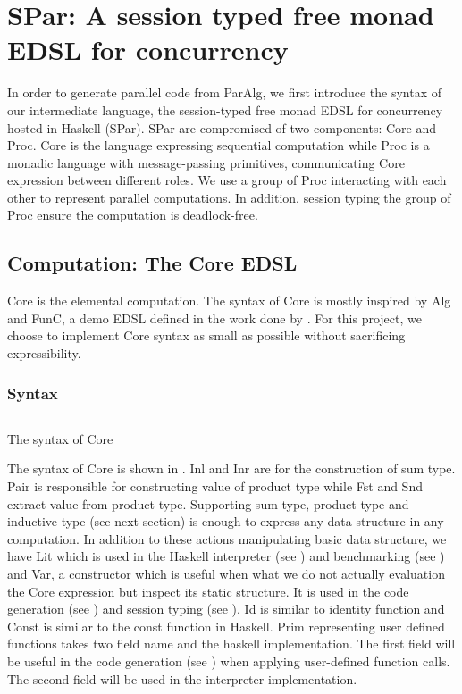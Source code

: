 \chapter{SPar: A session typed free monad EDSL for concurrency} \label{chap:spar}
In order to generate parallel code from ParAlg, we first introduce the syntax of our intermediate language, the session-typed free monad EDSL for concurrency hosted in Haskell (SPar). SPar are compromised of two components: Core and Proc. Core is the language expressing sequential computation while Proc is a monadic language with message-passing primitives, communicating Core expression between different roles. We use a group of Proc interacting with each other to represent parallel computations. In addition, session typing the group of Proc ensure the computation is deadlock-free. 
\section{Computation: The Core EDSL}
Core is the elemental computation. The syntax of Core is mostly inspired by Alg \cite{AlgebraicMultipartyProtocol} and FunC, a demo EDSL defined in the work done by \cite{svenningssonCombiningDeepShallow2015}. For this project, we choose to implement Core syntax as small as possible without sacrificing expressibility.
\subsection{Syntax}
\begin{listing}[ht]
    \inputminted{Haskell}{spar/core.hs}
    \caption{The syntax of Core}
    \label{spar:code:core}
\end{listing}
The syntax of Core is shown in . Inl and Inr are for the construction of sum type. Pair is responsible for constructing value of product type while Fst and Snd extract value from product type. Supporting sum type, product type and inductive type (see next section) is enough to express any data structure in any computation. In addition to these actions manipulating basic data structure, we have Lit which is used in the Haskell interpreter (see ) and benchmarking (see ) and Var, a constructor which is useful when what we do not actually evaluation the Core expression but inspect its static structure. It is used in the code generation (see ) and session typing (see ). Id is similar to identity function and Const is similar to the const function in Haskell. Prim representing user defined functions takes two field name and the haskell implementation. The first field will be useful in the code generation (see ) when applying user-defined function calls. The second field will be used in the interpreter implementation.   

